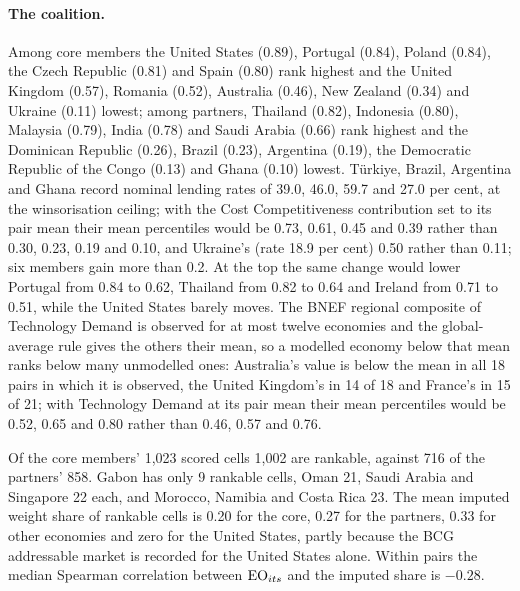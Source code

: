 \paragraph{The coalition.} Among core members the United States (0.89), Portugal (0.84), Poland
(0.84), the Czech Republic (0.81) and Spain (0.80) rank highest and the United Kingdom (0.57),
Romania (0.52), Australia (0.46), New Zealand (0.34) and Ukraine (0.11) lowest; among partners,
Thailand (0.82), Indonesia (0.80), Malaysia (0.79), India (0.78) and Saudi Arabia (0.66) rank highest
and the Dominican Republic (0.26), Brazil (0.23), Argentina (0.19), the Democratic Republic of the
Congo (0.13) and Ghana (0.10) lowest. T\"urkiye, Brazil, Argentina and Ghana record nominal lending
rates of 39.0, 46.0, 59.7 and 27.0 per cent, at the winsorisation ceiling; with the Cost
Competitiveness contribution set to its pair mean their mean percentiles would be 0.73, 0.61, 0.45
and 0.39 rather than 0.30, 0.23, 0.19 and 0.10, and Ukraine's (rate 18.9 per cent) 0.50 rather than
0.11; six members gain more than 0.2. At the top the same change would lower Portugal from 0.84 to
0.62, Thailand from 0.82 to 0.64 and Ireland from 0.71 to 0.51, while the United States barely
moves. The BNEF regional composite of Technology Demand is observed for at most twelve economies
and the global-average rule gives the others their mean, so a modelled economy below that mean
ranks below many unmodelled ones: Australia's value is below the mean in all 18 pairs in which it is
observed, the United Kingdom's in 14 of 18 and France's in 15 of 21; with Technology Demand at its
pair mean their mean percentiles would be 0.52, 0.65 and 0.80 rather than 0.46, 0.57 and 0.76.

Of the core members' 1{,}023 scored cells 1{,}002 are rankable, against 716 of the partners' 858.
Gabon has only 9 rankable cells, Oman 21, Saudi Arabia and Singapore 22 each, and Morocco, Namibia
and Costa Rica 23. The mean imputed weight share of rankable cells is 0.20 for the core, 0.27 for
the partners, 0.33 for other economies and zero for the United States, partly because the BCG
addressable market is recorded for the United States alone. Within pairs the median Spearman
correlation between $\mathrm{EO}_{its}$ and the imputed share is $-0.28$.

